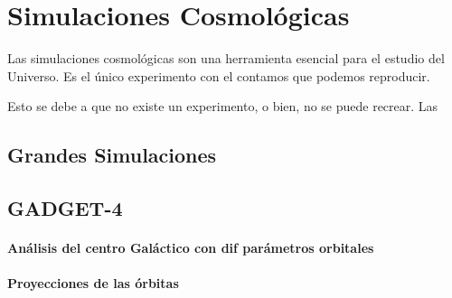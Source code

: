 
\chapter{Simulaciones Cosmológicas}
\label{chap:2 Sim}
\setcounter{equation}{0}
Las simulaciones cosmológicas son una herramienta esencial para el estudio del Universo. Es el único experimento con el contamos que podemos reproducir.

Esto se debe a que no existe un experimento, o bien, no se puede recrear. Las


\section{Grandes Simulaciones}


\section{GADGET-4}



\subsubsection{Análisis del centro Galáctico con dif parámetros orbitales}




\subsubsection{Proyecciones de las órbitas}
